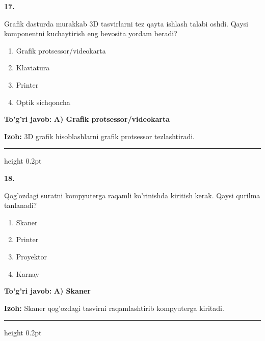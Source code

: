 \documentclass[10pt,a4paper]{article}
\begin{document}
{\bfseries\sffamily\color{ink} 17.}
\par
Grafik dasturda murakkab 3D tasvirlarni tez qayta ishlash talabi oshdi. Qaysi komponentni kuchaytirish eng bevosita yordam beradi?
\begin{enumerate}[label=\Alph*),leftmargin=9mm]
\item Grafik protsessor/videokarta
\item Klaviatura
\item Printer
\item Optik sichqoncha
\end{enumerate}
\begin{tcolorbox}[enhanced,breakable,colback=teal!4,colframe=teal!60!black,boxrule=0.45pt,arc=1.2mm,left=2.7mm,right=2.7mm,top=1.8mm,bottom=1.8mm,before skip=2mm,after skip=2mm]
{\bfseries\sffamily\color{teal}To'g'ri javob:} \textbf{A) Grafik protsessor/videokarta}
\par\smallskip
{\bfseries Izoh:} 3D grafik hisoblashlarni grafik protsessor tezlashtiradi.
\end{tcolorbox}
\vspace{2mm}\hrule height 0.2pt\vspace{3mm}

{\bfseries\sffamily\color{ink} 18.}
\par
Qog'ozdagi suratni kompyuterga raqamli ko'rinishda kiritish kerak. Qaysi qurilma tanlanadi?
\begin{enumerate}[label=\Alph*),leftmargin=9mm]
\item Skaner
\item Printer
\item Proyektor
\item Karnay
\end{enumerate}
\begin{tcolorbox}[enhanced,breakable,colback=teal!4,colframe=teal!60!black,boxrule=0.45pt,arc=1.2mm,left=2.7mm,right=2.7mm,top=1.8mm,bottom=1.8mm,before skip=2mm,after skip=2mm]
{\bfseries\sffamily\color{teal}To'g'ri javob:} \textbf{A) Skaner}
\par\smallskip
{\bfseries Izoh:} Skaner qog'ozdagi tasvirni raqamlashtirib kompyuterga kiritadi.
\end{tcolorbox}
\vspace{2mm}\hrule height 0.2pt\vspace{3mm}
\end{document}
